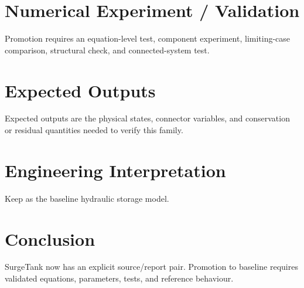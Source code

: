 \documentclass[10pt,a4paper]{article}
\begin{document}
\section{Numerical Experiment / Validation}Promotion requires an equation-level test, component experiment, limiting-case comparison, structural check, and connected-system test.
\section{Expected Outputs}Expected outputs are the physical states, connector variables, and conservation or residual quantities needed to verify this family.
\section{Engineering Interpretation}Keep as the baseline hydraulic storage model.
\section*{Conclusion}SurgeTank now has an explicit source/report pair. Promotion to baseline requires validated equations, parameters, tests, and reference behaviour.
\end{document}
